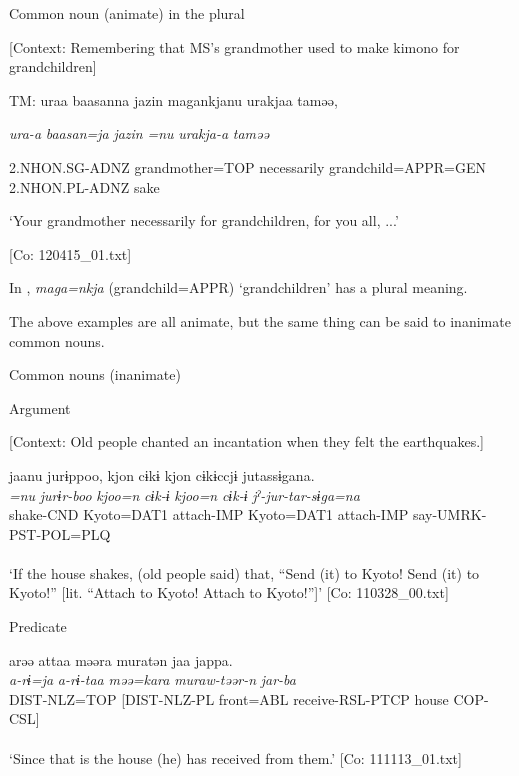 \ea \label{ex:7:2}  Common noun (animate) in the plural

  [Context: Remembering that MS’s grandmother used to make kimono for grandchildren]

  TM:  uraa  baasanna  jazin  magankjanu urakjaa  taməə,

    \textit{ura-a}  \textit{baasan=ja}  \textit{jazin}  \textit{=nu}   \textit{urakja-a}  \textit{taməə}

    2.NHON.SG-ADNZ  grandmother=TOP  necessarily  grandchild=APPR=GEN  2.NHON.PL-ADNZ  sake
    
    ‘Your grandmother necessarily for grandchildren, for you all, ...’

    [Co: 120415\_01.txt]
\z

In , \textit{maga=nkja} (grandchild=APPR) ‘grandchildren’ has a plural meaning.

  The above examples are all animate, but the same thing can be said to inanimate common nouns.

\ea \label{ex:7:3}  Common nouns (inanimate)

\ea \label{ex:7:3a}Argument

    [Context: Old people chanted an incantation when they felt the earthquakes.]

\gllll  jaanu  jurɨppoo,  kjon  cɨkɨ  kjon   cɨkɨccjɨ  jutassɨgana.\\
\textit{=nu}  \textit{jurɨr-boo}  \textit{kjoo=n}  \textit{cɨk-ɨ}  \textit{kjoo=n}   \textit{cɨk-ɨ}  \textit{jˀ-jur-tar-sɨga=na}\\
[house=NOM]  shake-CND  Kyoto=DAT1  attach-IMP  Kyoto=DAT1  attach-IMP  say-UMRK-PST-POL=PLQ\\
[Subject]        \\
\glt ‘If the house shakes, (old people said) that, “Send (it) to Kyoto! Send (it) to Kyoto!” [lit. “Attach to Kyoto! Attach to Kyoto!”]’ [Co: 110328\_00.txt]

\ex \label{ex:7:3b}Predicate

\gllll  arəə  attaa  məəra  muratən  jaa  jappa.\\
\textit{a-rɨ=ja}  \textit{a-rɨ-taa}  \textit{məə=kara}  \textit{muraw-təər-n}  \textit{}  \textit{jar-ba}\\
DIST-NLZ=TOP  [DIST-NLZ-PL  front=ABL  receive-RSL-PTCP  house                               COP-CSL]\\
[Nominal predicate]\\
\glt ‘Since that is the house (he) has received from them.’ [Co: 111113\_01.txt]

